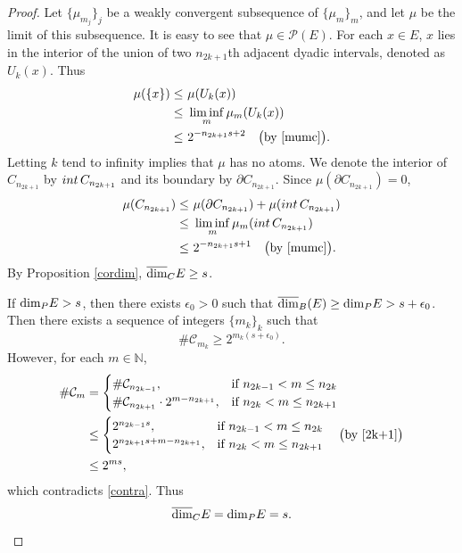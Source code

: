 \documentclass[10pt,a4paper]{amsart}
\newcommand\pkd{\mbox{\rm dim}_{\rm P}} %
\newcommand\ubd{\overline{\mbox{\rm dim}}_{\rm B}} %
\newcommand\ucod{\overline{\mbox{\rm dim}}_{\rm C}} %
\begin{document}
\begin{proof}
		Let $\{\mu_{m_j}\}_j$ be a weakly convergent subsequence of $\{\mu_m\}_m$, and let $\mu$ be the limit of this subsequence.
		It is easy to see that $\mu\in\mathcal{P}(E)$.
		For each $x\in E$, $x$ lies in the interior of the union of two ${n_{2k+1}}$th adjacent dyadic intervals, denoted as $U_k(x)$.
			Thus
		\begin{align*}
			\mu(\{x\})\leq&\ \mu(U_k(x))\\
		\leq&\ \liminf_m\mu_m(U_k(x))\\
		\leq&\  2^{-n_{2k+1}s+2}\quad\big(\text{by } \eqref{mumc}\big).
		\end{align*}	
			Letting  $k$ tend to infinity  implies that $\mu$ has no atoms.
			We denote the interior of  ${C}_{n_{2k+1}}$ by ${\rm int }\,{C}_{n_{2k+1}}$ and its boundary by  $\partial C_{n_{2k+1}}$. Since $\mu(\partial C_{n_{2k+1}})=0$, 
		\begin{align*}
			\mu(C_{n_{2k+1}})\leq&\ \mu(\partial C_{n_{2k+1}})+\mu({\rm int }\,{C}_{n_{2k+1}})\\
			\leq&\ \liminf_m\mu_{m}({\rm int }\,{C}_{n_{2k+1}})\\
			\leq&\ 2^{-n_{2k+1}s+1}\quad\big(\text{by } \eqref{mumc}\big).
		\end{align*}	
By Proposition \ref{cordim},  $\ucod E\geq s$.
		
		If $\pkd  E> s$, then there exists $\epsilon_0>0$ such that $\ubd(E)\geq\pkd E> s+\epsilon_0$.
		Then  there exists a sequence of integers $\{m_k\}_k$ such that
		\begin{equation}\label{contra}
			\#\mathcal{C}_{m_k}\geq 2^{m_k(s+\epsilon_0)}.
		\end{equation}
		However, for each $m\in\mathbb{N}$, 
			\begin{align*}
			\#\mathcal{C}_m&=\begin{cases}
				\#\mathcal{C}_{n_{2k-1}}, & \text{if } n_{2k-1}<m\leq n_{2k}\\
				\#\mathcal{C}_{n_{2k+1}}\cdot 2^{m-n_{2k+1}}, & \text{if } n_{2k}<m\leq n_{2k+1}
			\end{cases}\\
			&\leq\begin{cases}
				2^{n_{2k-1}s}, & \text{if } n_{2k-1}<m\leq n_{2k}\\
				2^{n_{2k+1}s+m-n_{2k+1}}, & \text{if } n_{2k}<m\leq n_{2k+1}
			\end{cases}\quad\big(\text{by } \eqref{2k+1}\big)\\
			&\leq 2^{ms},
		\end{align*}
		which contradicts  \eqref{contra}.
		Thus $$\ucod E= \pkd E =s.$$
	\end{proof}
\end{document}

